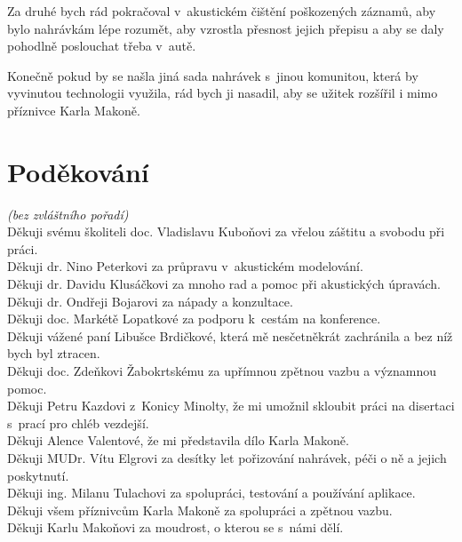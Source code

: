 Za druhé bych rád pokračoval v~akustickém čištění poškozených záznamů, aby bylo
nahrávkám lépe rozumět, aby vzrostla přesnost jejich přepisu a aby se daly
pohodlně poslouchat třeba v~autě.

Konečně pokud by se našla jiná sada nahrávek s~jinou komunitou, která by
vyvinutou technologii využila, rád bych ji nasadil, aby se užitek rozšířil i
mimo příznivce Karla Makoně.

\section{Poděkování}

{\em (bez zvláštního pořadí)}\\
Děkuji svému školiteli doc. Vladislavu Kuboňovi za vřelou záštitu a svobodu při
práci.\\
Děkuji dr. Nino Peterkovi za průpravu v~akustickém modelování.\\
Děkuji dr. Davidu Klusáčkovi za mnoho rad a pomoc při akustických úpravách.\\
Děkuji dr. Ondřeji Bojarovi za nápady a konzultace.\\
Děkuji doc. Markétě Lopatkové za podporu k~cestám na konference.\\
Děkuji vážené paní Libušce Brdičkové, která mě nesčetněkrát zachránila a bez níž
bych byl ztracen.\\
Děkuji doc. Zdeňkovi Žabokrtskému za upřímnou zpětnou vazbu a významnou pomoc.\\
Děkuji Petru Kazdovi z~Konicy Minolty, že mi umožnil skloubit práci na disertaci
s~prací pro chléb vezdejší.\\
Děkuji Alence Valentové, že mi představila dílo Karla Makoně.\\
Děkuji MUDr. Vítu Elgrovi za desítky let pořizování nahrávek, péči o ně a jejich
poskytnutí.\\
Děkuji ing. Milanu Tulachovi za spolupráci, testování a používání aplikace.\\
Děkuji všem příznivcům Karla Makoně za spolupráci a zpětnou vazbu.\\
Děkuji Karlu Makoňovi za moudrost, o kterou se s~námi dělí.
